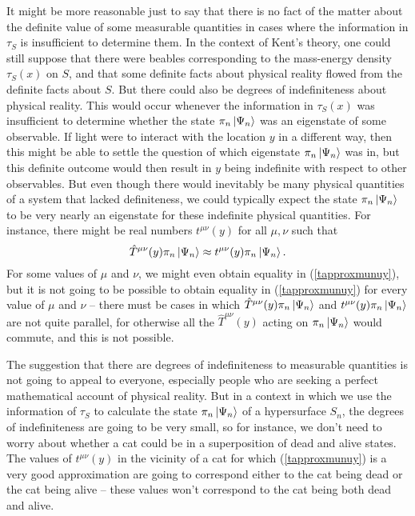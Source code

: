 It might be more reasonable just to say that there is no fact of the matter about the definite value of some measurable quantities in cases where the information in $\tau_S$ is insufficient to determine them.  In the context of Kent's theory, one could still suppose that there were beables corresponding to the mass-energy density $\tau_S(x)$ on $S$, and that some definite facts about physical reality flowed from the definite facts about $S$. But there could also be degrees of indefiniteness about physical reality. This would occur whenever the information in $\tau_S(x)$ was insufficient to determine whether the state $\pi_n\ket{\Psi_n}$ was an eigenstate of some observable. If light were to interact with the location $y$ in a different way, then this might be able to settle the question of which eigenstate $\pi_n\ket{\Psi_n}$ was in, but this definite outcome would then result in $y$ being indefinite with respect to other observables. But even though there would inevitably be many physical quantities of a system that lacked definiteness, we could typically expect the state $\pi_n\ket{\Psi_n}$ to be very nearly an eigenstate for these indefinite physical quantities. For instance, there might be real numbers $t^{\mu\nu}(y)$ %
%
 for all $\mu, \nu$ such that 
\begin{equation}\label{tapproxmunuy}
\hat{T}^{\mu\nu}(y)\pi_n\ket{\Psi_n}\approx t^{\mu\nu}(y)\pi_n\ket{\Psi_n}.
\end{equation}
For some values of $\mu$ and $\nu$, we might even obtain equality in (\ref{tapproxmunuy}), but it is not going to be possible to obtain equality in (\ref{tapproxmunuy}) for every value of $\mu$ and $\nu$ -- there must be cases in which $\hat{T}^{\mu\nu}(y)\pi_n\ket{\Psi_n}$ and $t^{\mu\nu}(y)\pi_n\ket{\Psi_n}$ are not quite parallel, for otherwise all the $\hat{T}^{\mu\nu}(y)$  acting on $\pi_n\ket{\Psi_n}$ would commute, and this is not possible. 

The suggestion that there are degrees of indefiniteness to measurable quantities is not going to appeal to everyone, especially people who are seeking a perfect mathematical account of physical reality. But in a context in which we use the information of $\tau_S$ to calculate the state $\pi_n\ket{\Psi_n}$ of a hypersurface $S_n$, the degrees of indefiniteness are going to be very small, so for instance, we don't need to worry about whether a cat could be in a superposition of dead and alive states. The values of $t^{\mu\nu}(y)$ in the vicinity of a cat for which (\ref{tapproxmunuy}) is a very good approximation are going to correspond either to the cat being dead or the cat being alive -- these values won't correspond to the cat being both dead and alive.

